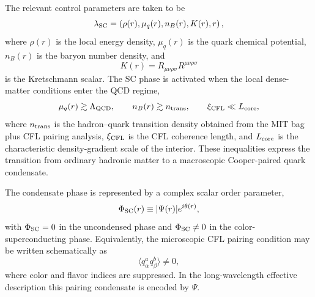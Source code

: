 \documentclass[epj]{svjour}
\begin{document}
The relevant control parameters are taken to be
\begin{equation}
\lambda_{\rm SC}
=
\left(
\rho(r),
\mu_q(r),
n_B(r),
K(r),
r
\right),
\label{eq:SC_control_parameters}
\end{equation}
where $\rho(r)$ is the local energy density, $\mu_q(r)$ is the quark chemical
potential, $n_B(r)$ is the baryon number density, and
\begin{equation}
K(r)
=
R_{\mu\nu\rho\sigma}R^{\mu\nu\rho\sigma}
\label{eq:SC_kretschmann}
\end{equation}
is the Kretschmann scalar. The SC phase is activated when the local dense-matter
conditions enter the QCD regime,
\begin{equation}
\mu_q(r) \gtrsim \Lambda_{\rm QCD},
\qquad
n_B(r) \gtrsim n_{\rm trans},
\qquad
\xi_{\rm CFL} \ll L_{\rm core},
\label{eq:SC_activation_conditions}
\end{equation}
where $n_{\rm trans}$ is the hadron--quark transition density obtained from the
MIT bag plus CFL pairing analysis, $\xi_{\rm CFL}$ is the CFL coherence length,
and $L_{\rm core}$ is the characteristic density-gradient scale of the interior.
These inequalities express the transition from ordinary hadronic matter to a
macroscopic Cooper-paired quark condensate.

The condensate phase is represented by a complex scalar order parameter,
\begin{equation}
\Phi_{\rm SC}(r)
\equiv
|\Psi(r)| e^{i\theta(r)},
\label{eq:SC_order_parameter}
\end{equation}
with $\Phi_{\rm SC}=0$ in the uncondensed phase and
$\Phi_{\rm SC}\neq 0$ in the color-superconducting phase. Equivalently, the
microscopic CFL pairing condition may be written schematically as
\begin{equation}
\langle q^a_{\alpha} q^b_{\beta} \rangle \neq 0,
\label{eq:SC_pairing_order}
\end{equation}
where color and flavor indices are suppressed. In the long-wavelength effective
description this pairing condensate is encoded by $\Psi$.
\end{document}
